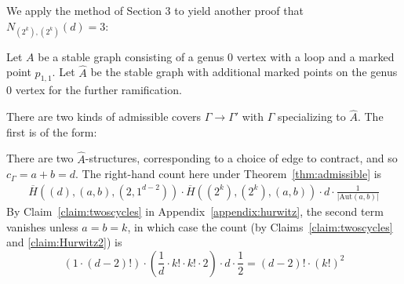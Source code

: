 \documentclass[thesis]{thesis-umich}           %
\newcommand{\Aut}{\text{Aut}}
\theoremstyle{definition}
\begin{document}
We apply the method of Section 3 to yield another proof that
$N_{(2^k),(2^k)}(d)=3$:

 Let $A$ be a stable graph consisting of a genus $0$ vertex with a loop and a marked point $p_{1,1}$.
  Let $\hat A$ be the stable graph with additional marked points on the genus $0$ vertex for
  the further ramification.

There are two kinds of
admissible covers $\Gamma\to\Gamma'$ with $\Gamma$ specializing to $\hat A$. The first
is of the form:


            There are two $\hat A$-structures, corresponding to a choice
            of edge to contract, and so $c_{\Gamma}=a+b=d$. The right-hand count here under Theorem~\ref{thm:admissible} is
            \begin{align*}
              \overline H((d),(a,b),(2,1^{d-2}))\cdot \overline H((2^k),(2^k),(a,b))\cdot d\cdot\frac 1{|\Aut(a,b)|}
            \end{align*}
            By Claim~\ref{claim:twoscycles} in Appendix~\ref{appendix:hurwitz}, the second term vanishes unless $a=b=k$, in which case
            the count (by Claims~\ref{claim:twoscycles} and \ref{claim:Hurwitz2}) is
            \[
            (1\cdot (d-2)!)\cdot \left(\frac 1d\cdot k!\cdot k!\cdot 2\right)\cdot d\cdot\frac 12
            =(d-2)!\cdot (k!)^2
            \]
\end{document}
